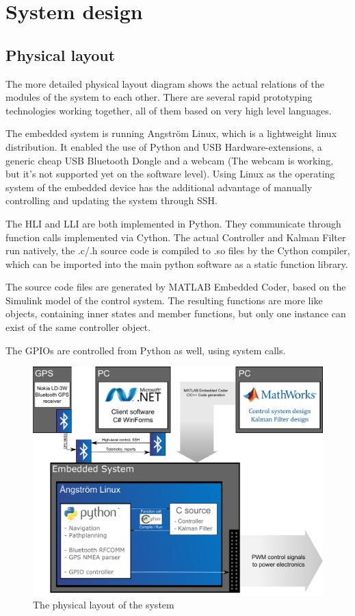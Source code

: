 \section{System design}



\subsection{Physical layout}

The more detailed physical layout diagram shows the actual relations of the modules of the system to each other. There are several rapid prototyping technologies working together, all of them based on very high level languages.

The embedded system is running Angström Linux, which is a lightweight linux distribution. It enabled the use of Python and USB Hardware-extensions, a generic cheap USB Bluetooth Dongle and a webcam (The webcam is working, but it’s not supported yet on the software level).
Using Linux as the operating system of the embedded device has the additional advantage of manually controlling and updating the system through SSH.

The HLI and LLI are both implemented in Python. They communicate through function calls implemented via Cython. The actual Controller and Kalman Filter run natively, the .c/.h source code is compiled to .so files by the Cython compiler, which can be imported into the main python software as a static function library.

The source code files are generated by MATLAB Embedded Coder, based on the Simulink model of the control system. The resulting functions are more like objects, containing inner states and member functions, but only one instance can exist of the same controller object.

The GPIOs are controlled from Python as well, using system calls.

\begin{figure}[H]
	\centering
	\includegraphics[width=1\textwidth]{img2/PhysicalLayout}
	\caption{The physical layout of the system}
	\label{fig:PhysicalLayout}
\end{figure}

